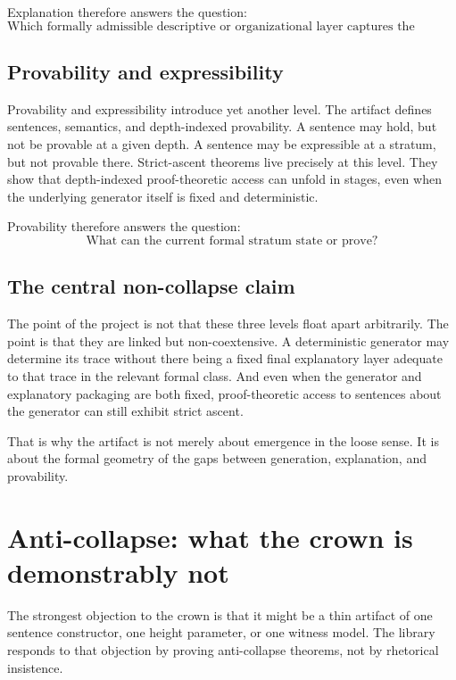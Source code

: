 \documentclass[11pt,a4paper]{article}
\theoremstyle{definition}
\begin{document}
Explanation therefore answers the question:
\[
\text{Which formally admissible descriptive or organizational layer captures the relevant structure?}
\]

\subsection{Provability and expressibility}

Provability and expressibility introduce yet another level. The artifact defines sentences, semantics, and depth-indexed provability. A sentence may hold, but not be provable at a given depth. A sentence may be expressible at a stratum, but not provable there. Strict-ascent theorems live precisely at this level. They show that depth-indexed proof-theoretic access can unfold in stages, even when the underlying generator itself is fixed and deterministic.

Provability therefore answers the question:
\[
\text{What can the current formal stratum state or prove?}
\]

\subsection{The central non-collapse claim}

The point of the project is not that these three levels float apart arbitrarily. The point is that they are linked but non-coextensive. A deterministic generator may determine its trace without there being a fixed final explanatory layer adequate to that trace in the relevant formal class. And even when the generator and explanatory packaging are both fixed, proof-theoretic access to sentences about the generator can still exhibit strict ascent.

That is why the artifact is not merely about emergence in the loose sense. It is about the formal geometry of the gaps between generation, explanation, and provability.

\section{Anti-collapse: what the crown is demonstrably not}\label{sec:anti-collapse}

The strongest objection to the crown is that it might be a thin artifact of one sentence constructor, one height parameter, or one witness model. The library responds to that objection by proving anti-collapse theorems, not by rhetorical insistence.
\end{document}
